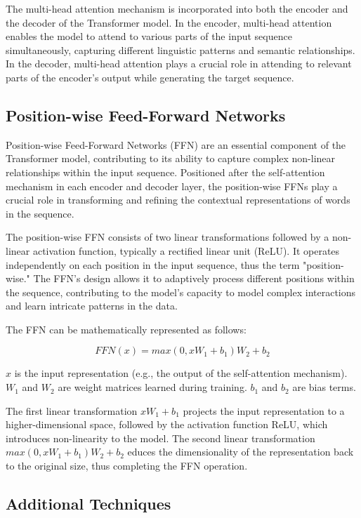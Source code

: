 \documentclass{article}
\begin{document}
The multi-head attention mechanism is incorporated into both the encoder and the decoder of the Transformer model. In the encoder, multi-head attention enables the model to attend to various parts of the input sequence simultaneously, capturing different linguistic patterns and semantic relationships. In the decoder, multi-head attention plays a crucial role in attending to relevant parts of the encoder's output while generating the target sequence.


\subsection{Position-wise Feed-Forward Networks}

Position-wise Feed-Forward Networks (FFN) are an essential component of the Transformer model, contributing to its ability to capture complex non-linear relationships within the input sequence. Positioned after the self-attention mechanism in each encoder and decoder layer, the position-wise FFNs play a crucial role in transforming and refining the contextual representations of words in the sequence.

The position-wise FFN consists of two linear transformations followed by a non-linear activation function, typically a rectified linear unit (ReLU). It operates independently on each position in the input sequence, thus the term "position-wise." The FFN's design allows it to adaptively process different positions within the sequence, contributing to the model's capacity to model complex interactions and learn intricate patterns in the data.

The FFN can be mathematically represented as follows:

$$ FFN(x) = max(0, xW_1 + b_1)W_2 + b_2 $$


$x$ is the input representation (e.g., the output of the self-attention mechanism). $W_1$ and $W_2$ are weight matrices learned during training. $b_1$ and $b_2$ are bias terms.

The first linear transformation $xW_1 + b_1$ projects the input representation to a higher-dimensional space, followed by the activation function ReLU, which introduces non-linearity to the model. The second linear transformation $max(0, xW_1 + b_1)W_2 + b_2$ educes the dimensionality of the representation back to the original size, thus completing the FFN operation.


\subsection{Additional Techniques}
\end{document}
